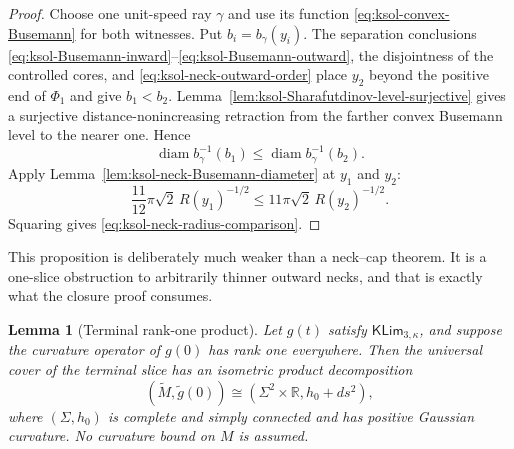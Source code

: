 \documentclass[10pt]{coll-l}
\newcommand{\R}{\mathbb{R}}
\newtheorem{lemma}[theorem]{Lemma}
\theoremstyle{definition}
\theoremstyle{remark}
\numberwithin{section}{chapter}
\numberwithin{equation}{chapter}
\begin{document}
\begin{proof}
Choose one unit-speed ray $\gamma$ and use its function
\eqref{eq:ksol-convex-Busemann} for both witnesses.
Put $b_i=b_\gamma(y_i)$.  The separation conclusions
\eqref{eq:ksol-Busemann-inward}--\eqref{eq:ksol-Busemann-outward}, the
disjointness of the controlled cores, and
\eqref{eq:ksol-neck-outward-order} place $y_2$ beyond the positive end of
$\Phi_1$ and give $b_1<b_2$.
Lemma~\ref{lem:ksol-Sharafutdinov-level-surjective} gives a surjective
distance-nonincreasing retraction from the farther convex Busemann level to
the nearer one.  Hence
\[
       \operatorname{diam}b_\gamma^{-1}(b_1)
       \leq\operatorname{diam}b_\gamma^{-1}(b_2).
\]
Apply Lemma~\ref{lem:ksol-neck-Busemann-diameter} at $y_1$ and $y_2$:
\[
 \frac{11}{12}\pi\sqrt2\,R(y_1)^{-1/2}
       \leq11\pi\sqrt2\,R(y_2)^{-1/2}.
\]
Squaring gives \eqref{eq:ksol-neck-radius-comparison}.
\end{proof}

This proposition is deliberately much weaker than a neck--cap theorem.  It
is a one-slice obstruction to arbitrarily thinner outward necks, and that is
exactly what the closure proof consumes.

\begin{lemma}[Terminal rank-one product]
\label{lem:ksol-terminal-rank-one-product}
Let $g(t)$ satisfy $\mathsf{KLim}_{3,\kappa}$, and suppose the curvature
operator of $g(0)$ has rank one everywhere.  Then the universal cover of
the terminal slice has an isometric product decomposition
\begin{equation}
       (\widetilde M,\widetilde g(0))
       \cong(\Sigma^2\times\R,h_0+ds^2),              \label{eq:ksol-KLim-terminal-product}
\end{equation}
where $(\Sigma,h_0)$ is complete and simply connected and has positive
Gaussian curvature.  No curvature bound on $M$ is assumed.
\end{lemma}
\end{document}
